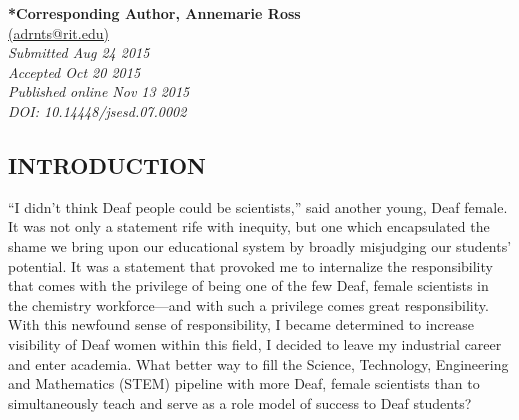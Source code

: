 \documentclass[11.5pt]{sig-alternate} %
\begin{document}
\textbf{*Corresponding Author, Annemarie Ross}\\
\href{mailto: adrnts@rit.edu }{(adrnts@rit.edu)} \\
\textit{Submitted  Aug 24 2015}\\
\textit{Accepted Oct 20 2015} \\
\textit{Published online  Nov 13 2015 } \\
\textit{DOI: 10.14448/jsesd.07.0002} \\
\pagebreak
\clearpage
\begin{large}
\section*{INTRODUCTION}

“I didn’t think Deaf people could be scientists,” said another young, Deaf female. It was not only a statement rife with inequity, but one which encapsulated the shame we bring upon our educational system by broadly misjudging our students’ potential. It was a statement that provoked me to internalize the responsibility that comes with the privilege of being one of the few Deaf, female scientists in the chemistry workforce—and with such a privilege comes great responsibility. With this newfound sense of responsibility, I became determined to increase visibility of Deaf women within this field, I decided to leave my industrial career and enter academia.  What better way to fill the Science, Technology, Engineering and Mathematics (STEM) pipeline with more Deaf, female scientists than to simultaneously teach and serve as a role model of success to Deaf students? 


\end{large}
\end{document}
